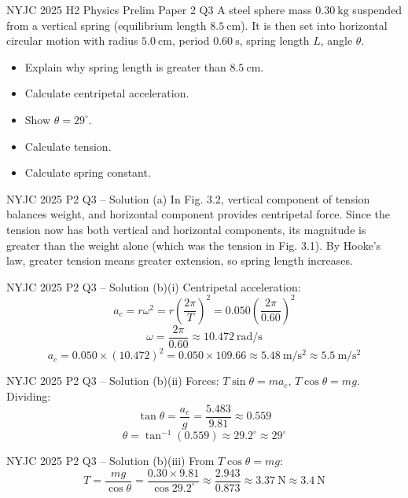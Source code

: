 \documentclass[11pt]{beamer}
\begin{document}
\begin{frame}[shrink=15]{NYJC 2025 H2 Physics Prelim Paper 2 Q3}
A steel sphere mass $0.30\ \mathrm{kg}$ suspended from a vertical spring (equilibrium length $8.5\ \mathrm{cm}$). It is then set into horizontal circular motion with radius $5.0\ \mathrm{cm}$, period $0.60\ \mathrm{s}$, spring length $L$, angle $\theta$.
\begin{itemize}
    \item[(a)] Explain why spring length is greater than $8.5\ \mathrm{cm}$.
    \item[(b)(i)] Calculate centripetal acceleration.
    \item[(b)(ii)] Show $\theta = 29^\circ$.
    \item[(b)(iii)] Calculate tension.
    \item[(b)(iv)] Calculate spring constant.
\end{itemize}
\end{frame}

\begin{frame}{NYJC 2025 P2 Q3 – Solution (a)}
In Fig. 3.2, vertical component of tension balances weight, and horizontal component provides centripetal force. Since the tension now has both vertical and horizontal components, its magnitude is greater than the weight alone (which was the tension in Fig. 3.1). By Hooke's law, greater tension means greater extension, so spring length increases.
\end{frame}

\begin{frame}{NYJC 2025 P2 Q3 – Solution (b)(i)}
Centripetal acceleration:
\[ a_c = r\omega^2 = r\left(\frac{2\pi}{T}\right)^2 = 0.050\left(\frac{2\pi}{0.60}\right)^2 \]
\[ \omega = \frac{2\pi}{0.60} \approx 10.472\ \mathrm{rad/s} \]
\[ a_c = 0.050\times(10.472)^2 = 0.050\times109.66 \approx 5.48\ \mathrm{m/s^2} \approx 5.5\ \mathrm{m/s^2} \]
\end{frame}

\begin{frame}{NYJC 2025 P2 Q3 – Solution (b)(ii)}
Forces: $T\sin\theta = m a_c$, $T\cos\theta = mg$. Dividing:
\[ \tan\theta = \frac{a_c}{g} = \frac{5.483}{9.81} \approx 0.559 \]
\[ \theta = \tan^{-1}(0.559) \approx 29.2^\circ \approx 29^\circ \]
\end{frame}

\begin{frame}{NYJC 2025 P2 Q3 – Solution (b)(iii)}
From $T\cos\theta = mg$:
\[ T = \frac{mg}{\cos\theta} = \frac{0.30\times9.81}{\cos29.2^\circ} \approx \frac{2.943}{0.873} \approx 3.37\ \mathrm{N} \approx 3.4\ \mathrm{N} \]
\end{frame}
\end{document}
